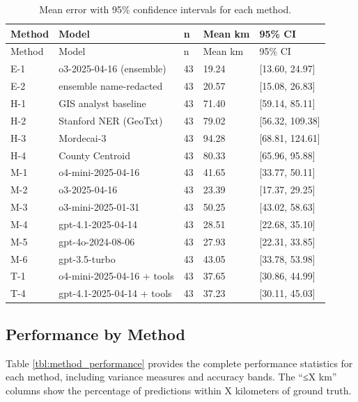 \begin{longtable}[]{@{}lllll@{}}
\caption{\label{tbl:error_ci}Mean error with 95\% confidence intervals
for each method.}\tabularnewline
\toprule\noalign{}
Method & Model & n & Mean km & 95\% CI \\
\midrule\noalign{}
\endfirsthead
\toprule\noalign{}
Method & Model & n & Mean km & 95\% CI \\
\midrule\noalign{}
\endhead
\bottomrule\noalign{}
\endlastfoot
E-1 & o3-2025-04-16 (ensemble) & 43 & 19.24 & {[}13.60, 24.97{]} \\
E-2 & ensemble name-redacted & 43 & 20.57 & {[}15.08, 26.83{]} \\
H-1 & GIS analyst baseline & 43 & 71.40 & {[}59.14, 85.11{]} \\
H-2 & Stanford NER (GeoTxt) & 43 & 79.02 & {[}56.32, 109.38{]} \\
H-3 & Mordecai-3 & 43 & 94.28 & {[}68.81, 124.61{]} \\
H-4 & County Centroid & 43 & 80.33 & {[}65.96, 95.88{]} \\
M-1 & o4-mini-2025-04-16 & 43 & 41.65 & {[}33.77, 50.11{]} \\
M-2 & o3-2025-04-16 & 43 & 23.39 & {[}17.37, 29.25{]} \\
M-3 & o3-mini-2025-01-31 & 43 & 50.25 & {[}43.02, 58.63{]} \\
M-4 & gpt-4.1-2025-04-14 & 43 & 28.51 & {[}22.68, 35.10{]} \\
M-5 & gpt-4o-2024-08-06 & 43 & 27.93 & {[}22.31, 33.85{]} \\
M-6 & gpt-3.5-turbo & 43 & 43.05 & {[}33.78, 53.98{]} \\
T-1 & o4-mini-2025-04-16 + tools & 43 & 37.65 & {[}30.86, 44.99{]} \\
T-4 & gpt-4.1-2025-04-14 + tools & 43 & 37.23 & {[}30.11, 45.03{]} \\
\end{longtable}

\subsection{Performance by
Method}\label{b.2-performance-by-method}

Table \ref{tbl:method_performance} provides the complete performance
statistics for each method, including variance measures and accuracy
bands. The ``≤X km'' columns show the percentage of predictions within X
kilometers of ground truth.

